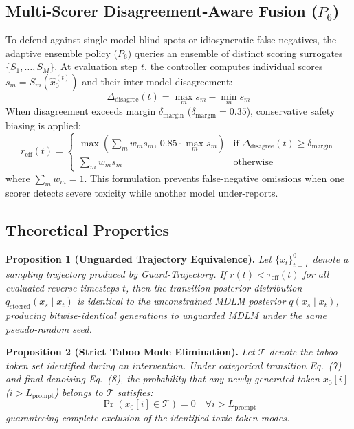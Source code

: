 \documentclass[11pt]{article}
\begin{document}
\subsection{Multi-Scorer Disagreement-Aware Fusion ($P_6$)}
To defend against single-model blind spots or idiosyncratic false negatives, the adaptive ensemble policy ($P_6$) queries an ensemble of distinct scoring surrogates $\{S_1, \dots, S_M\}$. At evaluation step $t$, the controller computes individual scores $s_m = S_m(\hat{x}_0^{(t)})$ and their inter-model disagreement:
\begin{equation}
\Delta_{\text{disagree}}(t) = \max_{m} s_m - \min_{m} s_m
\end{equation}
When disagreement exceeds margin $\delta_{\text{margin}}$ ($\delta_{\text{margin}} = 0.35$), conservative safety biasing is applied:
\begin{equation}
r_{\text{eff}}(t) = \begin{cases}
\max\left( \sum_{m} w_m s_m, \, 0.85 \cdot \max_{m} s_m \right) & \text{if } \Delta_{\text{disagree}}(t) \ge \delta_{\text{margin}} \\
\sum_{m} w_m s_m & \text{otherwise}
\end{cases}
\end{equation}
where $\sum_m w_m = 1$. This formulation prevents false-negative omissions when one scorer detects severe toxicity while another model under-reports.

\subsection{Theoretical Properties}
\noindent\textbf{Proposition 1 (Unguarded Trajectory Equivalence).}
\textit{Let $\{x_t\}_{t=T}^0$ denote a sampling trajectory produced by Guard-Trajectory. If $r(t) < \tau_{\text{eff}}(t)$ for all evaluated reverse timesteps $t$, then the transition posterior distribution $q_{\text{steered}}(x_s \mid x_t)$ is identical to the unconstrained MDLM posterior $q(x_s \mid x_t)$, producing bitwise-identical generations to unguarded MDLM under the same pseudo-random seed.}

\noindent\textbf{Proposition 2 (Strict Taboo Mode Elimination).}
\textit{Let $\mathcal{T}$ denote the taboo token set identified during an intervention. Under categorical transition Eq.~(7) and final denoising Eq.~(8), the probability that any newly generated token $x_0[i]$ ($i > L_{\text{prompt}}$) belongs to $\mathcal{T}$ satisfies:
\begin{equation}
\Pr(x_0[i] \in \mathcal{T}) = 0 \quad \forall i > L_{\text{prompt}}
\end{equation}
guaranteeing complete exclusion of the identified toxic token modes.}
\end{document}
